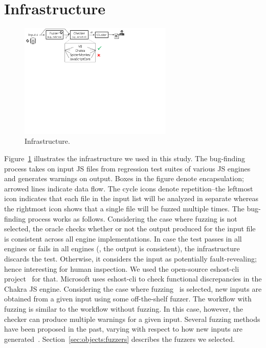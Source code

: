 \documentclass[10pt,conference,anonymous]{IEEEtran}
\begin{document}
\section{Infrastructure}
\label{sec:design}


\begin{figure}[t]
  \centering
  \includegraphics[trim=0 350 0 0,clip,width=0.65\textwidth]{diff-testing-runtimes}
  \caption{\label{fig:workflow}Infrastructure.}
\end{figure}

Figure~\ref{fig:workflow} illustrates the infrastructure we used in
this study.  The bug-finding process takes on input JS files from
regression test suites of various JS engines and generates warnings on
output. Boxes in the figure denote encapsulation; arrowed lines
indicate data flow. The cycle icons denote repetition--the leftmost
icon indicates that each file in the input list will be analyzed in
separate whereas the rightmost icon shows that a single file will be
fuzzed multiple times. The bug-finding process works as follows.
Considering the case where fuzzing is not selected, the oracle checks
whether or not the output produced for the input file is consistent
across all engine implementations. In case the test passes in all
engines or fails in all engines (\ie{}, the output is consistent), the
infrastructure discards the test. Otherwise, it considers the input as
potentially fault-revealing; hence interesting for human
inspection. We used the open-source eshost-cli
project~\cite{eshost-cli} for that. Microsoft uses eshost-cli to check
functional discrepancies in the Chakra JS engine. Considering the case
where fuzzing~\cite{fuzz-testing-history} is selected, new inputs are
obtained from a given input using some off-the-shelf fuzzer. The
workflow with fuzzing is similar to the workflow without fuzzing. In
this case, however, the checker can produce multiple warnings for a
given input. Several fuzzing methods have been proposed in the past,
varying with respect to how new inputs are
generated~\cite{afl,honggfuzz,grammarinator,jsfunfuzz,radamsa}.
Section~\ref{sec:objects:fuzzers} describes the fuzzers we selected.
\end{document}
